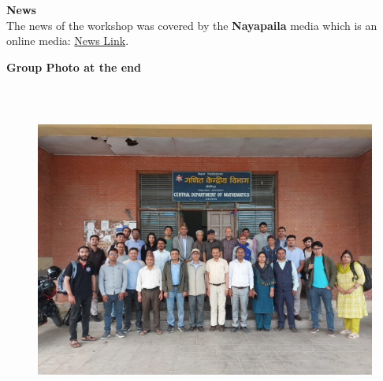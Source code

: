 \documentclass[a4paper,12pt]{report}
\begin{document}
\clearpage

\vspace*{10mm}
{\bfseries \large News}\\[3mm]
The news of the workshop was covered by the \textbf{Nayapaila} media which is an online media: \href{https://nayapailaonline.com/2024/05/08/%e0%a4%97%e0%a4%a3%e0%a4%bf%e0%a4%a4-%e0%a4%95%e0%a5%87%e0%a4%a8%e0%a5%8d%e0%a4%a6%e0%a5%8d%e0%a4%b0%e0%a5%80%e0%a4%af-%e0%a4%b5%e0%a4%bf%e0%a4%ad%e0%a4%be%e0%a4%97%e0%a4%ae%e0%a4%be-%e0%a5%a9/}{News Link}.


\vspace*{50mm}

{\bfseries \large Group Photo at the end}
\vspace*{5mm}

\begin{figure}[h!]
  \centering
  \includegraphics[width=15cm, height=11cm]{group.jpg}
\end{figure}
\end{document}
